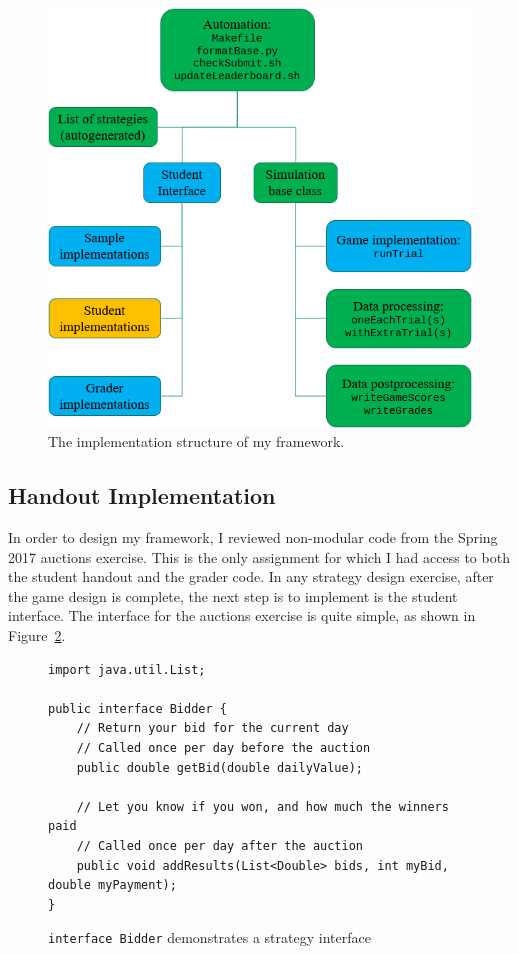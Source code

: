 \documentclass[pageno]{jpaper}
\begin{document}
\begin{figure}[hbt]
  \centering
  \includegraphics[scale=0.75]{outline.png}
  \caption{The implementation structure of my framework.}\label{fig:outline}
\end{figure}

\subsection*{Handout Implementation}
In order to design my framework, I reviewed non-modular code from the Spring 2017 auctions exercise.
This is the only assignment for which I had access to both the student handout and the grader code.
In any strategy design exercise, after the game design is complete, the next step is to implement is the student interface.
The interface for the auctions exercise is quite simple, as shown in Figure~\ref{minted:Bidder}.
\begin{figure}[hbt]
\begin{verbatim}
import java.util.List;

public interface Bidder {
    // Return your bid for the current day
    // Called once per day before the auction
    public double getBid(double dailyValue);

    // Let you know if you won, and how much the winners paid
    // Called once per day after the auction
    public void addResults(List<Double> bids, int myBid, double myPayment);
}
\end{verbatim}
  \caption{\texttt{interface Bidder} demonstrates a strategy interface}\label{minted:Bidder}
\end{figure}
\end{document}
